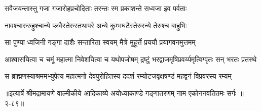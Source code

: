\twolineshloka
{सवैजयन्तास्तु गजा गजारोहप्रचोदिताः}
{तरन्तः स्म प्रकाशन्ते सध्वजा इव पर्वताः} %

\twolineshloka
{नावश्चारुरुहुश्चान्ये प्लवैस्तेरुस्तथापरे}
{अन्ये कुम्भघटैस्तेरुरन्ये तेरुश्च बाहुभिः} %

\twolineshloka
{सा पुण्या ध्वजिनी गङ्गा दाशैः सन्तारिता स्वयम्}
{मैत्रे मुहूर्त्ते प्रययौ प्रयागवनमुत्तमम्} %

\twolineshloka
{आश्वासयित्वा च चमूं महात्मा निवेशयित्वा च यथोपजोषम्}
{द्रष्टुं भरद्वाजमृषिप्रवर्य्यमृत्विग्वृतः सन् भरतः प्रतस्थे} %

\twolineshloka
{स ब्राह्मणस्याश्रममभ्युपेत्य महात्मनो देवपुरोहितस्य}
{ददर्श रम्योटजवृक्षषण्डं महद्वनं विप्रवरस्य रम्यम्} %


॥इत्यार्षे श्रीमद्रामायणे वाल्मीकीये आदिकाव्ये अयोध्याकाण्डे गङ्गातरणम् नाम एकोननवतितमः सर्गः ॥२-८९॥
